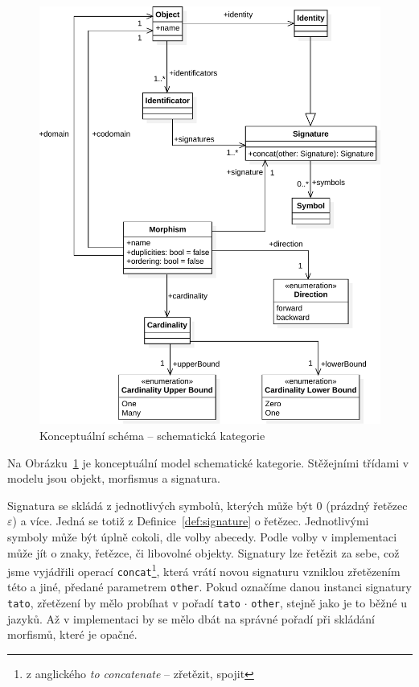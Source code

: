 \begin{figure}[!htb]
  \centering
  \includegraphics[width=\maxwidth{\textwidth}]{../img/diagrams/schema-category-model.pdf}
  \caption{Konceptuální schéma -- schematická kategorie}
  \label{fig:class-diagram:schemcat}
\end{figure}

Na Obrázku~\ref{fig:class-diagram:schemcat} je konceptuální model schematické kategorie.
Stěžejními třídami v modelu jsou objekt, morfismus a signatura.

Signatura se skládá z jednotlivých symbolů, kterých může být 0 (prázdný řetězec $\varepsilon$) a více.
Jedná se totiž z Definice~\ref{def:signature} o řetězec.
Jednotlivými symboly může být úplně cokoli, dle volby abecedy.
Podle volby v implementaci může jít o znaky, řetězce, či libovolné objekty.
Signatury lze řetězit za sebe, což jsme vyjádřili operací \texttt{concat}\footnote{z anglického \emph{to concatenate} -- zřetězit, spojit},
která vrátí novou signaturu vzniklou zřetězením této a jiné, předané parametrem \texttt{other}.
Pokud označíme danou instanci signatury \texttt{tato}, zřetězení by mělo probíhat v pořadí \texttt{tato} $\cdot$ \texttt{other}, stejně jako je to běžné u jazyků.
Až v implementaci by se mělo dbát na správné pořadí při skládání morfismů, které je opačné.

